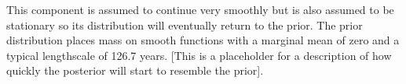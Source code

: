 This component is assumed to continue very smoothly but is also assumed to be stationary so its distribution will eventually return to the prior.
The prior distribution places mass on smooth functions with a marginal mean of zero and a typical lengthscale of 126.7 years.
[This is a placeholder for a description of how quickly the posterior will start to resemble the prior].